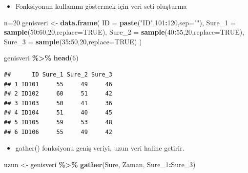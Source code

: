 \documentclass[
  oneside]{book}
\newenvironment{Shaded}{\begin{snugshade}}{\end{snugshade}}
\newcommand{\AttributeTok}[1]{\textcolor[rgb]{0.13,0.29,0.53}{#1}}
\newcommand{\ConstantTok}[1]{\textcolor[rgb]{0.56,0.35,0.01}{#1}}
\newcommand{\DecValTok}[1]{\textcolor[rgb]{0.00,0.00,0.81}{#1}}
\newcommand{\FunctionTok}[1]{\textcolor[rgb]{0.13,0.29,0.53}{\textbf{#1}}}
\newcommand{\NormalTok}[1]{#1}
\newcommand{\OtherTok}[1]{\textcolor[rgb]{0.56,0.35,0.01}{#1}}
\newcommand{\SpecialCharTok}[1]{\textcolor[rgb]{0.81,0.36,0.00}{\textbf{#1}}}
\newcommand{\StringTok}[1]{\textcolor[rgb]{0.31,0.60,0.02}{#1}}
\providecommand{\tightlist}{%
  \setlength{\itemsep}{0pt}\setlength{\parskip}{0pt}}
\begin{document}
\begin{itemize}
\tightlist
\item
  Fonksiyonun kullanımı göstermek için veri seti oluşturma
\end{itemize}

\begin{Shaded}
\begin{Highlighting}[]
\NormalTok{n}\OtherTok{=}\DecValTok{20}
\NormalTok{genisveri }\OtherTok{\textless{}{-}} \FunctionTok{data.frame}\NormalTok{(}
  \AttributeTok{ID =} \FunctionTok{paste}\NormalTok{(}\StringTok{"ID"}\NormalTok{,}\DecValTok{101}\SpecialCharTok{:}\DecValTok{120}\NormalTok{,}\AttributeTok{sep=}\StringTok{""}\NormalTok{),}
  \AttributeTok{Sure\_1 =} \FunctionTok{sample}\NormalTok{(}\DecValTok{50}\SpecialCharTok{:}\DecValTok{60}\NormalTok{,}\DecValTok{20}\NormalTok{,}\AttributeTok{replace=}\ConstantTok{TRUE}\NormalTok{),}
  \AttributeTok{Sure\_2 =} \FunctionTok{sample}\NormalTok{(}\DecValTok{40}\SpecialCharTok{:}\DecValTok{55}\NormalTok{,}\DecValTok{20}\NormalTok{,}\AttributeTok{replace=}\ConstantTok{TRUE}\NormalTok{),}
  \AttributeTok{Sure\_3 =} \FunctionTok{sample}\NormalTok{(}\DecValTok{35}\SpecialCharTok{:}\DecValTok{50}\NormalTok{,}\DecValTok{20}\NormalTok{,}\AttributeTok{replace=}\ConstantTok{TRUE}\NormalTok{)}
\NormalTok{)}
\end{Highlighting}
\end{Shaded}

\begin{Shaded}
\begin{Highlighting}[]
\NormalTok{genisveri }\SpecialCharTok{\%\textgreater{}\%} \FunctionTok{head}\NormalTok{(}\DecValTok{6}\NormalTok{)}
\end{Highlighting}
\end{Shaded}

\begin{verbatim}
##      ID Sure_1 Sure_2 Sure_3
## 1 ID101     55     49     46
## 2 ID102     60     51     42
## 3 ID103     50     41     36
## 4 ID104     51     40     45
## 5 ID105     59     53     48
## 6 ID106     55     49     42
\end{verbatim}

\begin{itemize}
\tightlist
\item
  gather() fonksiyonu geniş veriyi, uzun veri haline getirir.
\end{itemize}

\begin{Shaded}
\begin{Highlighting}[]
\NormalTok{uzun }\OtherTok{\textless{}{-}}\NormalTok{ genisveri }\SpecialCharTok{\%\textgreater{}\%} \FunctionTok{gather}\NormalTok{(Sure, Zaman, Sure\_1}\SpecialCharTok{:}\NormalTok{Sure\_3)}
\end{Highlighting}
\end{Shaded}
\end{document}
